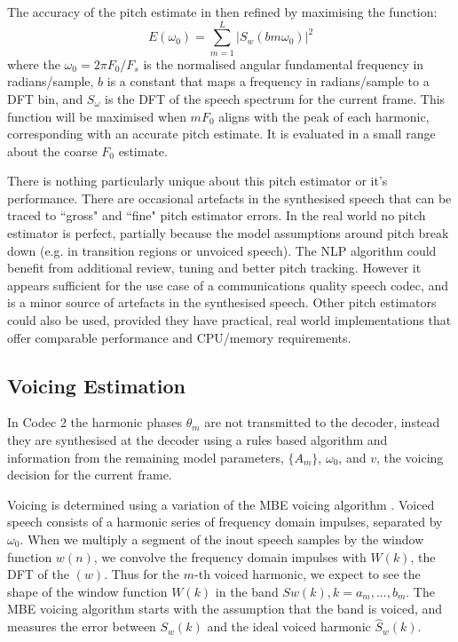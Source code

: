 \documentclass{article}
\begin{document}
The accuracy of the pitch estimate in then refined by maximising the function:
\begin{equation}
E(\omega_0)=\sum_{m=1}^L|S_w(b m \omega_0)|^2
\end{equation}
where the $\omega_0=2 \pi F_0 /F_s$ is the normalised angular fundamental frequency in radians/sample, $b$ is a constant that maps a frequency in radians/sample to a DFT bin, and $S_\omega$ is the DFT of the speech spectrum for the current frame. This function will be maximised when $mF_0$ aligns with the peak of each harmonic, corresponding with an accurate pitch estimate.   It is evaluated in a small range about the coarse $F_0$ estimate.

There is nothing particularly unique about this pitch estimator or it's performance. There are occasional artefacts in the synthesised speech that can be traced to ``gross" and ``fine" pitch estimator errors.  In the real world no pitch estimator is perfect, partially because the model assumptions around pitch break down (e.g. in transition regions or unvoiced speech).  The NLP algorithm could benefit from additional review, tuning and better pitch tracking.  However it appears sufficient for the use case of a communications quality speech codec, and is a minor source of artefacts in the synthesised speech. Other pitch estimators could also be used, provided they have practical, real world implementations that offer comparable performance and CPU/memory requirements.

\subsection{Voicing Estimation}

In Codec 2 the harmonic phases $\theta_m$ are not transmitted to the decoder, instead they are synthesised at the decoder using a rules based algorithm and information from the remaining model parameters, $\{A_m\}$, $\omega_0$, and $v$, the voicing decision for the current frame.

Voicing is determined using a variation of the MBE voicing algorithm \cite{griffin1988multiband}.  Voiced speech consists of a harmonic series of frequency domain impulses, separated by $\omega_0$.  When we multiply a segment of the inout speech samples by the window function $w(n)$, we convolve the frequency domain impulses with $W(k)$, the DFT of the $(w)$.  Thus for the $m$-th voiced harmonic, we expect to see the shape of the window function $W(k)$ in the band $Sw(k), k=a_m,...,b_m$.  The MBE voicing algorithm starts with the assumption that the band is voiced, and measures the error between $S_w(k)$ and the ideal voiced harmonic $\hat{S}_w(k)$.
\end{document}

